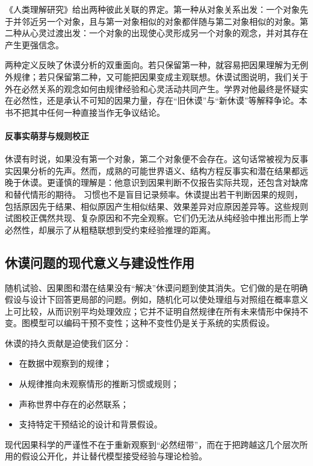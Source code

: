 《人类理解研究》给出两种彼此关联的界定。第一种从对象关系出发：一个对象先于并邻近另一个对象，且与第一对象相似的对象都伴随与第二对象相似的对象。第二种从心灵过渡出发：一个对象的出现使心灵形成另一个对象的观念，并对其存在产生更强信念\parencite[第七节]{humeEnquiry}。

两种定义反映了休谟分析的双重面向。若只保留第一种，就容易把因果理解为无例外规律；若只保留第二种，又可能把因果变成主观联想。休谟试图说明，我们关于外在必然关系的观念如何由规律经验和心灵活动共同产生。学界对他最终是怀疑实在必然性，还是承认不可知的因果力量，存在“旧休谟”与“新休谟”等解释争论。本书不把其中任何一种直接当作无争议结论。

\paragraph{反事实萌芽与规则校正}

休谟有时说，如果没有第一个对象，第二个对象便不会存在。这句话常被视为反事实因果分析的先声。然而，成熟的可能世界语义、结构方程反事实和潜在结果都远晚于休谟。更谨慎的理解是：他意识到因果判断不仅报告实际共现，还包含对缺席和替代情形的期待。
习惯也不是盲目记录频率。休谟提出若干判断因果的规则，包括原因先于结果、相似原因产生相似结果、效果差异对应原因差异等。这些规则试图校正偶然共现、复杂原因和不完全观察。它们仍无法从纯经验中推出形而上学必然性，却展示了从粗糙联想到受约束经验推理的距离。

\subsection{休谟问题的现代意义与建设性作用}

随机试验、因果图和潜在结果没有“解决”休谟问题到使其消失。它们做的是在明确假设与设计下回答更局部的问题。例如，随机化可以使处理组与对照组在概率意义上可比较，从而识别平均处理效应；它并不证明自然规律在所有未来情形中保持不变。图模型可以编码干预不变性；这种不变性仍是关于系统的实质假设。

休谟的持久贡献是迫使我们区分：

\begin{itemize}
  \item 在数据中观察到的规律；
  \item 从规律推向未观察情形的推断习惯或规则；
  \item 声称世界中存在的必然联系；
  \item 支持特定干预结论的设计和背景假设。
\end{itemize}

现代因果科学的严谨性不在于重新观察到“必然纽带”，而在于把跨越这几个层次所用的假设公开化，并让替代模型接受经验与理论检验。

